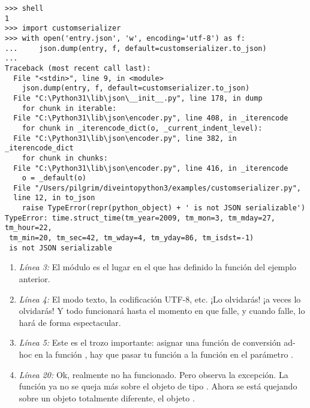 \noindent\begin{minipage}{\textwidth}
\begin{lstlisting}[mathescape=True]
>>> shell
1
>>> import customserializer
>>> with open('entry.json', 'w', encoding='utf-8') as f:
...     json.dump(entry, f, default=customserializer.to_json)
... 
Traceback (most recent call last):
  File "<stdin>", line 9, in <module>
    json.dump(entry, f, default=customserializer.to_json)
  File "C:\Python31\lib\json\__init__.py", line 178, in dump
    for chunk in iterable:
  File "C:\Python31\lib\json\encoder.py", line 408, in _iterencode
    for chunk in _iterencode_dict(o, _current_indent_level):
  File "C:\Python31\lib\json\encoder.py", line 382, in _iterencode_dict
    for chunk in chunks:
  File "C:\Python31\lib\json\encoder.py", line 416, in _iterencode
    o = _default(o)
  File "/Users/pilgrim/diveintopython3/examples/customserializer.py", 
  line 12, in to_json
    raise TypeError(repr(python_object) + ' is not JSON serializable')
TypeError: time.struct_time(tm_year=2009, tm_mon=3, tm_mday=27, tm_hour=22,
 tm_min=20, tm_sec=42, tm_wday=4, tm_yday=86, tm_isdst=-1) 
 is not JSON serializable
\end{lstlisting}
\end{minipage}

\begin{enumerate}

\item \emph{Línea 3:} El módulo  es el lugar en el que has definido la función  del ejemplo anterior.

\item \emph{Línea 4:} El modo texto, la codificación UTF-8, etc. ¡Lo olvidarás! ¡a veces lo olvidarás! Y todo funcionará hasta el momento en que falle, y cuando falle, lo hará de forma espectacular.

\item \emph{Línea 5:} Este es el trozo importante: asignar una función de conversión ad-hoc en la función , hay que pasar tu función a la función  en el parámetro .

\item \emph{Línea 20:} Ok, realmente no ha funcionado. Pero observa la excepción. La función  ya no se queja más sobre el objeto de tipo . Ahora se está quejando sobre un objeto totalmente diferente, el objeto .

\end{enumerate}

